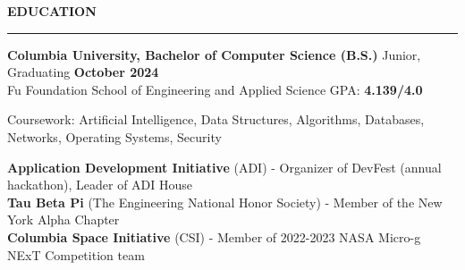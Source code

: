 \documentclass[11pt,letterpaper]{article}
\begin{document}
\medskip
\MakeUppercase{{\bf Education}}
\medskip
\hrule
\begin{list}{}{\setlength{\leftmargin}{0em}}
    \item
          {\bf Columbia University, Bachelor of Computer Science (B.S.)} \hfill  {Junior, Graduating {\bf October 2024}}\\
          Fu Foundation School of Engineering and Applied Science \hfill {GPA: {\bf 4.139/4.0}}
          
          Coursework: Artificial Intelligence, Data Structures, Algorithms, Databases, Networks, Operating Systems, Security

            {\bf Application Development Initiative} (ADI) - Organizer of DevFest (annual hackathon), Leader of ADI House \\
            {\bf Tau Beta Pi} (The Engineering National Honor Society) - Member of the New York Alpha Chapter \\
            {\bf Columbia Space Initiative} (CSI) - Member of 2022-2023 NASA Micro-g NExT Competition team
\end{list}

\end{document}
